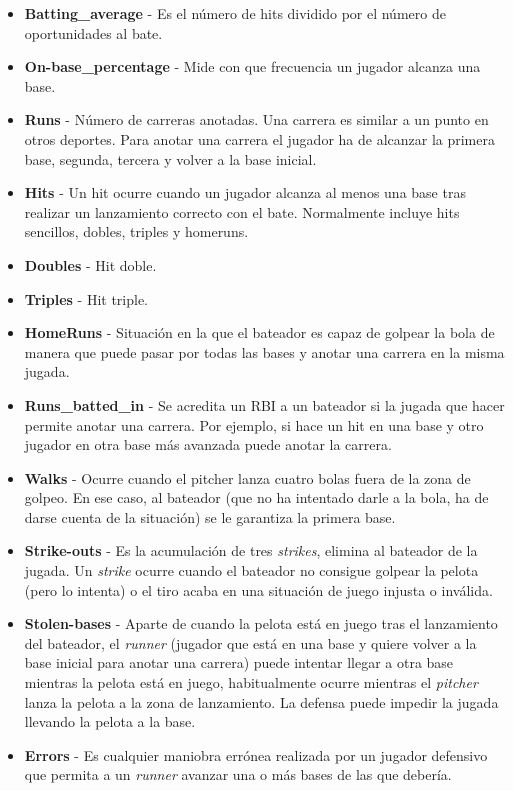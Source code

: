 \documentclass[a4paper,12pt, oneside]{book}
\begin{document}
\begin{itemize}
	\item \textbf{Batting\_average} - Es el número de hits dividido por el número de oportunidades al bate.
	\item \textbf{On-base\_percentage} - Mide con que frecuencia un jugador alcanza una base.
	\item \textbf{Runs} - Número de carreras anotadas. Una carrera es similar a un punto en otros deportes. Para anotar una carrera el jugador ha de alcanzar la primera base, segunda, tercera y volver a la base inicial.
	\item \textbf{Hits} - Un hit ocurre cuando un jugador alcanza al menos una base tras realizar un lanzamiento correcto con el bate. Normalmente incluye hits sencillos, dobles, triples y homeruns.
	\item \textbf{Doubles} - Hit doble.
	\item \textbf{Triples} - Hit triple.
	\item \textbf{HomeRuns} - Situación en la que el bateador es capaz de golpear la bola de manera que puede pasar por todas las bases y anotar una carrera en la misma jugada.
	\item \textbf{Runs\_batted\_in} - Se acredita un RBI a un bateador si la jugada que hacer permite anotar una carrera. Por ejemplo, si hace un hit en una base y otro jugador en otra base más avanzada puede anotar la carrera.
	\item \textbf{Walks} - Ocurre cuando el pitcher lanza cuatro bolas fuera de la zona de golpeo. En ese caso, al bateador (que no ha intentado darle a la bola, ha de darse cuenta de la situación) se le garantiza la primera base.
	\item \textbf{Strike-outs} - Es la acumulación de tres \textit{strikes}, elimina al bateador de la jugada. Un \textit{strike} ocurre cuando el bateador no consigue golpear la pelota (pero lo intenta) o el tiro acaba en una situación de juego injusta o inválida.
	\item \textbf{Stolen-bases} - Aparte de cuando la pelota está en juego tras el lanzamiento del bateador, el \textit{runner} (jugador que está en una base y quiere volver a la base inicial para anotar una carrera) puede intentar llegar a otra base mientras la pelota está en juego, habitualmente ocurre mientras el \textit{pitcher} lanza la pelota a la zona de lanzamiento. La defensa puede impedir la jugada llevando la pelota a la base.
	\item \textbf{Errors} - Es cualquier maniobra errónea realizada por un jugador defensivo que permita a un \textit{runner} avanzar una o más bases de las que debería.

\end{itemize}
\end{document}

